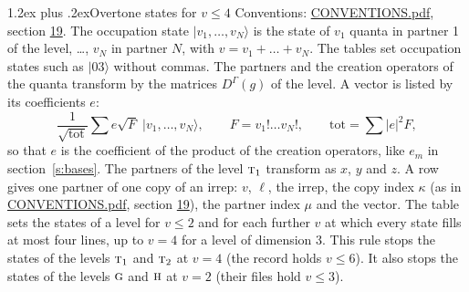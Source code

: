 \documentclass[10pt,a4paper]{article}
\makeatletter
\renewcommand\section{\@startsection{section}{1}{\z@}{-3ex plus -1ex minus -.2ex}%
  {1.2ex plus .2ex}{\normalfont\large\sffamily\bfseries\color{parttitle}}}
\numberwithin{equation}{section}
\newcommand{\irr}[1]{\text{\normalfont\scshape #1}}
\newcommand{\repD}[1]{D^{#1}}
\newcommand{\mult}{\kappa}
\newcommand{\intx}{\mu}
\newcommand{\occ}[1]{\lvert #1\rangle}
\makeatother
\begin{document}
\section{Overtone states for \texorpdfstring{$v \le 4$}{v \textleq\ 4}}\label{s:overtone_states}
Conventions: \href{../../CONVENTIONS.pdf}{CONVENTIONS.pdf}, section \href{../../CONVENTIONS.pdf\#conv.19}{19}.
\leavevmode\label{n:vector.occupation}\label{n:local.quanta.partner}\label{n:local.weight.occupation}The occupation state $\occ{v_1, \dots, v_N}$ is the state of $v_1$ quanta in partner 1 of the level, \dots, $v_N$ in partner $N$, with $v = v_1 + \dots + v_N$. The tables set occupation states such as $\occ{03}$ without commas. The partners and the creation operators of the quanta transform by the matrices $\repD{\Gamma}(g)$ of the level. A vector is listed by its coefficients $e$:
\begin{equation}\label{e:occupation}\frac{1}{\sqrt{\mathrm{tot}}}\sum e\sqrt{F}\;\occ{v_1, \dots, v_N},\qquad F = v_1!\dots v_N!,\qquad \mathrm{tot} = \sum |e|^2F,\end{equation}
so that $e$ is the coefficient of the product of the creation operators, like $e_m$ in section~\ref{s:bases}. The partners of the level $\irr{t}_{1}$ transform as $x$, $y$ and $z$. A row gives one partner of one copy of an irrep: $v$, $\ell$, the irrep, the copy index $\mult$ (as in \href{../../CONVENTIONS.pdf}{CONVENTIONS.pdf}, section \href{../../CONVENTIONS.pdf\#conv.19}{19}), the partner index $\intx$ and the vector.
The table sets the states of a level for $v \le 2$ and for each further $v$ at which every state fills at most four lines, up to $v = 4$ for a level of dimension 3. This rule stops the states of the levels $\irr{t}_{1}$ and $\irr{t}_{2}$ at $v = 4$ (the record holds $v \le 6$). It also stops the states of the levels $\irr{g}$ and $\irr{h}$ at $v = 2$ (their files hold $v \le 3$).
\end{document}
